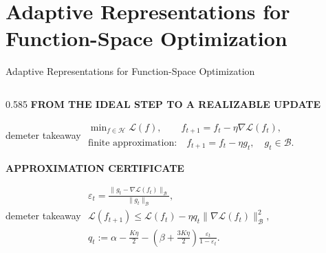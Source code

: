 \section{Adaptive Representations for Function-Space Optimization}

\begin{frame}[t]{Adaptive Representations for Function-Space Optimization}
  \vspace{-0.10cm}
  \begin{columns}[T,onlytextwidth]
    \begin{column}{0.585\textwidth}
      {\color{EnstaBlue}\bfseries\scriptsize FROM THE IDEAL STEP TO A REALIZABLE UPDATE}
      \vspace{0.03cm}

      \begin{beamercolorbox}[rounded=true,sep=0.10cm,wd=\linewidth]{demeter takeaway}
        \centering
        \fontsize{7.3}{8.6}\selectfont
        \(\displaystyle
          \begin{gathered}
            \min_{f\in\mathcal H}\mathcal L(f),
            \qquad f_{t+1}=f_t-\eta\nabla\mathcal L(f_t),\\[3pt]
            \text{finite approximation:}\quad
            f_{t+1}=f_t-\eta g_t,\quad g_t\in\mathcal B.
          \end{gathered}
        \)
      \end{beamercolorbox}

      \vspace{0.10cm}
      {\color{EnstaBlue}\bfseries\scriptsize APPROXIMATION CERTIFICATE}
      \vspace{0.03cm}

      \begin{beamercolorbox}[rounded=true,sep=0.10cm,wd=\linewidth]{demeter takeaway}
        \centering
        \fontsize{7.0}{8.3}\selectfont
        \(\displaystyle
          \begin{gathered}
            \varepsilon_t
            =\frac{\lVert g_t-\nabla\mathcal L(f_t)\rVert_{\mathcal B}}
                   {\lVert g_t\rVert_{\mathcal B}},\\[4pt]
            \mathcal L(f_{t+1})\leq \mathcal L(f_t)
            -\eta q_t\lVert\nabla\mathcal L(f_t)\rVert_{\mathcal B}^{2},\\[4pt]
            q_t:=\alpha-\frac{K\eta}{2}
            -\left(\beta+\frac{3K\eta}{2}\right)
             \frac{\varepsilon_t}{1-\varepsilon_t}.
          \end{gathered}
        \)
      \end{beamercolorbox}


\end{column}
\end{columns}
\end{frame}
